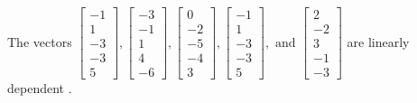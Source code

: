 \begin{exercise}
\begin{exerciseStatement}
  \end{exerciseStatement}
  \begin{exerciseAnswer}
   The vectors \(\left[\begin{array}{r}
-1 \\
1 \\
-3 \\
-3 \\
5
\end{array}\right] , \left[\begin{array}{r}
-3 \\
-1 \\
1 \\
4 \\
-6
\end{array}\right] , \left[\begin{array}{r}
0 \\
-2 \\
-5 \\
-4 \\
3
\end{array}\right] , \left[\begin{array}{r}
-1 \\
1 \\
-3 \\
-3 \\
5
\end{array}\right] , \text{ and } \left[\begin{array}{r}
2 \\
-2 \\
3 \\
-1 \\
-3
\end{array}\right]\) are 
  	 linearly dependent  .
  


  \end{exerciseAnswer}
\end{exercise}